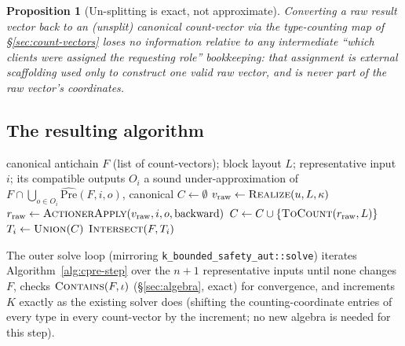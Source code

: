 \documentclass[11pt]{article}
\newtheorem{proposition}{Proposition}
\newcommand{\CPre}{\mathrm{CPre}}
\newcommand{\PreHat}{\widehat{\mathrm{Pre}}}
\begin{document}
\begin{proposition}[Un-splitting is exact, not approximate]
Converting a raw result vector back to an (unsplit) canonical count-vector
via the type-counting map of \S\ref{sec:count-vectors} loses no
information relative to any intermediate ``which clients were assigned the
requesting role'' bookkeeping: that assignment is external scaffolding
used only to construct one valid raw vector, and is never part of the raw
vector's coordinates.
\end{proposition}

\subsection{The resulting algorithm}

\begin{algorithm}[H]
\caption{One symmetric \CPre\ step for representative input $i$ (orbit
size $k$), replacing \texttt{cpre\_inplace}}
\label{alg:cpre-step}
\begin{algorithmic}[1]
\Require canonical antichain $F$ (list of count-vectors); block layout $L$;
   representative input $i$; its compatible outputs $O_i$
\Ensure a sound under-approximation of $F \cap \bigcup_{o\in O_i}\PreHat(F,i,o)$,
   canonical
\State $C \gets \emptyset$ 
    \State $v_{\mathrm{raw}} \gets \textsc{Realize}(u, L, \kappa)$
      \State $r_{\mathrm{raw}} \gets \textsc{ActionerApply}(v_{\mathrm{raw}}, i, o, \mathrm{backward})$
      \State $C \gets C \cup \{\textsc{ToCount}(r_{\mathrm{raw}}, L)\}$
    \EndFor
  \EndFor
\EndFor
\State $T_i \gets \textsc{Union}(C)$ 
\State \Return $\textsc{Intersect}(F, T_i)$ 
\end{algorithmic}
\end{algorithm}

The outer solve loop (mirroring \texttt{k\_bounded\_safety\_aut::solve})
iterates Algorithm~\ref{alg:cpre-step} over the $n+1$ representative
inputs until none changes $F$, checks $\textsc{Contains}(F,\iota)$
(\S\ref{sec:algebra}, exact) for convergence, and increments $K$ exactly as
the existing solver does (shifting the counting-coordinate entries of
every type in every count-vector by the increment; no new algebra is
needed for this step).
\end{document}
